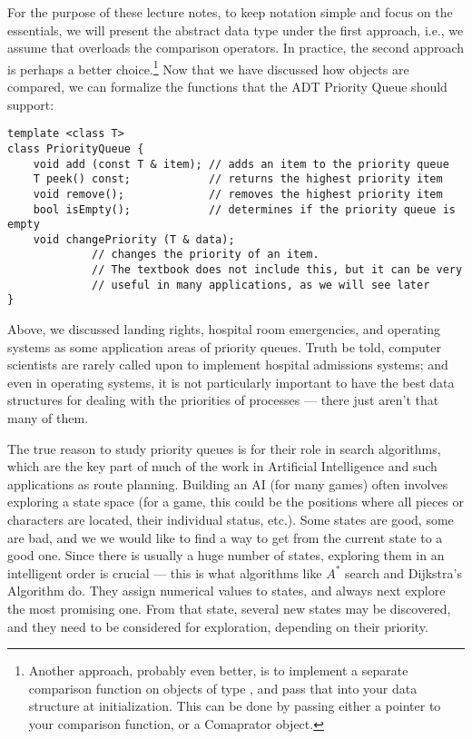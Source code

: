 For the purpose of these lecture notes, to keep notation simple and
focus on the essentials, we will present the abstract data type under
the first approach, i.e., we assume that  overloads the
comparison operators. In practice, the second approach is perhaps a
better choice.\footnote{Another approach, probably even better, is to
  implement a separate comparison function on 
  objects of type , and pass that into your data structure at
  initialization. This can be done by passing either a pointer to your
  comparison function, or a Comaprator object.}
Now that we have discussed how objects are compared, we can formalize
the functions that the ADT Priority Queue should support:

\begin{verbatim}
template <class T>
class PriorityQueue {
    void add (const T & item); // adds an item to the priority queue
    T peek() const;            // returns the highest priority item
    void remove();             // removes the highest priority item
    bool isEmpty();            // determines if the priority queue is empty
    void changePriority (T & data); 
             // changes the priority of an item.
             // The textbook does not include this, but it can be very
             // useful in many applications, as we will see later
}
\end{verbatim}

Above, we discussed landing rights, hospital room emergencies, and
operating systems as some application areas of priority queues. 
Truth be told, computer scientists are rarely called upon to implement
hospital admissions systems; and even in operating systems, it is not
particularly important to have the best data structures for dealing
with the priorities of processes --- there just aren't that many of
them.

The true reason to study priority queues is for their role in search
algorithms, which are the key part of much of the work in Artificial
Intelligence and such applications as route planning.
Building an AI (for many games) often involves exploring a state
space (for a game, this could be the positions where all pieces or
characters are located, their individual status, etc.).
Some states are good, some are bad, and we we would like to find a way
to get from the current state to a good one. Since there is usually a
huge number of states, exploring them in an intelligent order is
crucial --- this is what algorithms like $A^*$ search and Dijkstra's
Algorithm do. They assign numerical values to states, and always next
explore the most promising one. From that state, several new states
may be discovered, and they need to be considered for exploration,
depending on their priority.


